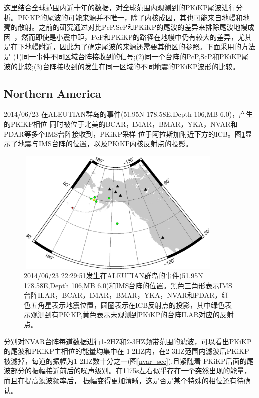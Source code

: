 这里结合全球范围内近十年的数据，对全球范围内观测到的PKiKP尾波进行分析。PKiKP的尾波的可能来源并不唯一，除了内核成因，其也可能来自地幔和地壳的散射。之前的研究通过对比PcP,ScP和PKiKP的尾波的差异来排除尾波地幔成因~\citep{Koper2004}，然而即使是小震中距，PcP和PKiKP的路径在地幔中仍有较大的差异，尤其是在下地幔附近，因此为了确定尾波的来源还需要其他区的参照。下面采用的方法是
(1)同一事件不同区域台阵接收到的信号;(2)同一个台阵的PcP,ScP和PKiKP尾波的比较;(3)台阵接收到的发生在同一区域的不同地震的PKiKP波形的比较。

\subsection{Northern America}

2014/06/23 在ALEUTIAN群岛的事件(51.95N 178.58E,Depth 106,MB 6.0)，产生的PKiKP相位
同时被位于北美的BCAR，IMAR，BMAR，YKA，NVAR和PDAR等多个IMS台阵接收到，PKiKP采样
位于阿拉斯加附近下方的ICB。图\ref{alas}显示了地震与IMS台阵的位置，以及PKiKP内核反射点的投影。

\begin{figure}[!ht]
	\centering
	\includegraphics[height=6cm,width=10cm]{fig/chap3/ALAS.eps}
	\caption{2014/06/23 22:29:51发生在ALEUTIAN群岛的事件(51.95N 178.58E,Depth 106,MB%
6.0)和IMS台阵的位置。黑色三角形表示IMS台阵ILAR，BCAR，IMAR，BMAR，YKA，NVAR和PDAR，红色五角星表示地震位置，圆圈表示在ICB反射点的投影，其中绿色表示观测到有PKiKP,黄色表示未观测到PKiKP的台阵ILAR对应的反射点。}
	\label{alas}
\end{figure}

分别对NVAR台阵每道数据进行1-2HZ和2-3HZ频带范围的滤波，可以看出PKiKP的尾波和PKiKP主相位的能量均集中在
1-2HZ内，在2-3HZ范围内滤波后PKiKP被滤掉，每道的振幅为1-2HZ数十分之一(图\ref{nvar_sec}),且紧随着
PKiKP后面的尾波部分的振幅接近前后的噪声级别。在1175s左右似乎存在一个突然出现的能量，而且在提高滤波频率后，
振幅变得更加清晰，这是否是某个特殊的相位还有待确认。

